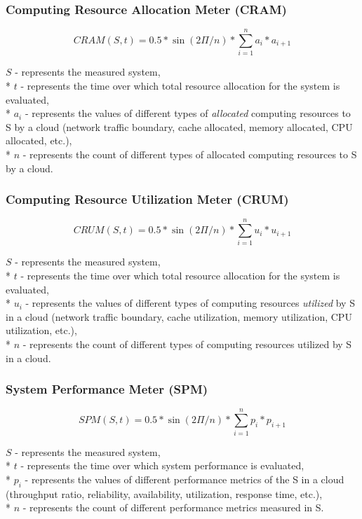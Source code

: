\documentclass{uvamscse}
\begin{document}
\subsubsection{Computing Resource Allocation Meter (CRAM)}
\begin{center}
  $$CRAM(S,t) = 0.5 * \sin(2\Pi/n) * \sum_{i=1}^{n}a_i*a_{i+1}$$
\end{center}
  \texttt{$S$} - represents the measured system, \\*
  \texttt{$t$} - represents the time over which total resource allocation for the system is evaluated, \\*
  \texttt{$a_i$} - represents the values of different types of \textit{allocated} computing resources to S by a cloud (network traffic boundary, cache allocated, memory allocated, CPU allocated, etc.), \\*
  \texttt{$n$} - represents the count of different types of allocated computing resources to S by a cloud.

\subsubsection{Computing Resource Utilization Meter (CRUM)}
\begin{center}
  $$CRUM(S,t) = 0.5 * \sin(2\Pi/n) * \sum_{i=1}^{n}u_i*u_{i+1}$$
\end{center}
  \texttt{$S$} - represents the measured system, \\*
  \texttt{$t$} - represents the time over which total resource allocation for the system is evaluated, \\*
  \texttt{$u_i$} - represents the values of different types of computing resources \textit{utilized} by S in a cloud (network traffic boundary, cache utilization, memory utilization, CPU utilization, etc.), \\*
  \texttt{$n$} - represents the count of different types of computing resources utilized by S in a cloud.

\subsubsection{System Performance Meter (SPM)}
\begin{center}
  $$SPM(S,t) = 0.5 * \sin(2\Pi/n) * \sum_{i=1}^{n}p_i*p_{i+1}$$
\end{center}
  \texttt{$S$} - represents the measured system, \\*
  \texttt{$t$} - represents the time over which system performance is evaluated, \\*
  \texttt{$p_i$} - represents the values of different performance metrics of the S in a cloud  (throughput ratio, reliability, availability, utilization, response time, etc.), \\*
  \texttt{$n$} - represents the count of different performance metrics measured in S.
\end{document}
